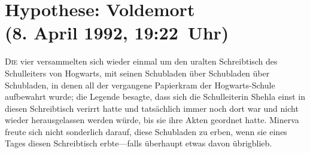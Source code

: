 \begin{headlines}
\label{American Mage:}


\label{Klitterer:}


\label{Tagesprophet:}

\end{headlines}

\section{Hypothese: Voldemort\\
(8. April 1992, 19:22~Uhr)}

\lettrine{D}{ie} vier versammelten sich wieder einmal um den uralten Schreibtisch des Schulleiters von Hogwarts, mit seinen Schubladen über Schubladen über Schubladen, in denen all der vergangene Papierkram der Hogwarts-Schule aufbewahrt wurde; die Legende besagte, dass sich die Schulleiterin Shehla einst in diesen Schreibtisch verirrt hatte und tatsächlich immer noch dort war und nicht wieder herausgelassen werden würde, bis sie ihre Akten geordnet hatte. Minerva freute sich nicht sonderlich darauf, diese Schubladen zu erben, wenn sie eines Tages diesen Schreibtisch erbte—falls überhaupt etwas davon übrigblieb.

